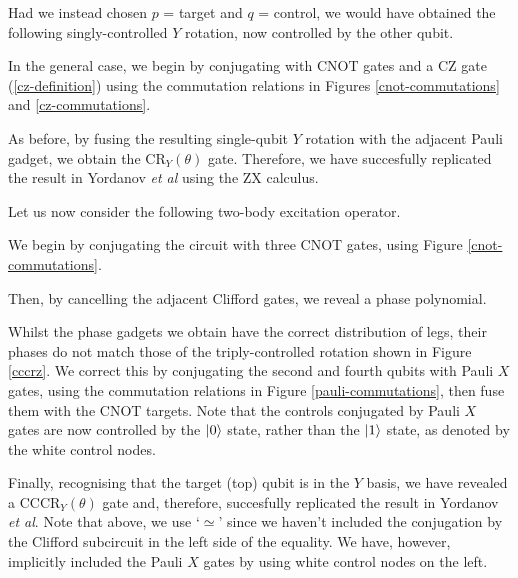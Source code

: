 
Had we instead chosen $p$ = target and $q$ = control, we would have obtained the following singly-controlled $Y$ rotation, now controlled by the other qubit.


In the general case, we begin by conjugating with CNOT gates and a CZ gate (\ref{cz-definition}) using the commutation relations in Figures \ref{cnot-commutations} and \ref{cz-commutations}.


As before, by fusing the resulting single-qubit $Y$ rotation with the adjacent Pauli gadget, we obtain the CR$_Y(\theta)$ gate. Therefore, we have succesfully replicated the result in Yordanov \textit{et al} using the ZX calculus.


Let us now consider the following two-body excitation operator.


We begin by conjugating the circuit with three CNOT gates, using Figure \ref{cnot-commutations}.


Then, by cancelling the adjacent Clifford gates, we reveal a phase polynomial.


Whilst the phase gadgets we obtain have the correct distribution of legs, their phases do not match those of the triply-controlled rotation shown in Figure \ref{cccrz}. We correct this by conjugating the second and fourth qubits with Pauli $X$ gates, using the commutation relations in Figure \ref{pauli-commutations}, then fuse them with the CNOT targets. Note that the controls conjugated by Pauli $X$ gates are now controlled by the $\ket 0$ state, rather than the $\ket 1$ state, as denoted by the white control nodes.


Finally, recognising that the target (top) qubit is in the $Y$ basis, we have revealed a CCCR$_Y(\theta)$ gate and, therefore, succesfully replicated the result in Yordanov \textit{et al}. Note that above, we use `$\simeq$' since we haven't included the conjugation by the Clifford subcircuit in the left side of the equality. We have, however, implicitly included the Pauli $X$ gates by using white control nodes on the left.

